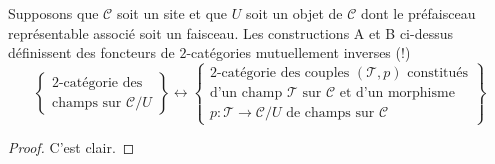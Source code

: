 \begin{lemma}
\label{lemma-localize-stacks}
Supposons que $\mathcal{C}$ soit un site
et que $U$ soit un objet de $\mathcal{C}$ dont le préfaisceau représentable
associé soit un faisceau. Les constructions A et B ci-dessus définissent
des foncteurs de $2$-catégories mutuellement inverses (!)
$$
\left\{
\begin{matrix}
2\text{-catégorie des}\\
\text{champs sur }\mathcal{C}/U
\end{matrix}
\right\}
\leftrightarrow
\left\{
\begin{matrix}
2\text{-catégorie des couples }(\mathcal{T}, p)
\text{ constitués} \\
\text{d'un champ }\mathcal{T}\text{ sur }\mathcal{C}\text{ et d'un morphisme} \\
p : \mathcal{T} \to \mathcal{C}/U\text{ de champs sur }\mathcal{C}
\end{matrix}
\right\}
$$
\end{lemma}

\begin{proof}
C'est clair.
\end{proof}










